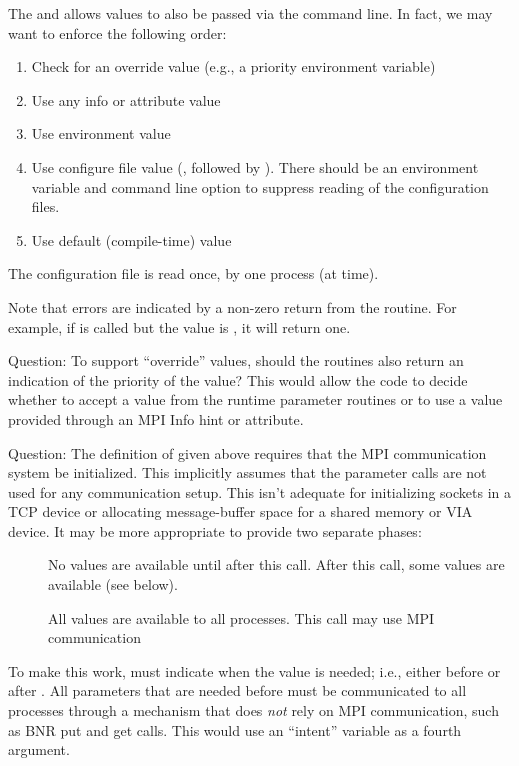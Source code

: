 \documentclass{article}
\begin{document}
The  and  allows
values to also be passed via the command line.  
In fact, we may want to enforce the following order:
\begin{enumerate}
\item Check for an override value (e.g., a priority environment variable)
\item Use any info or attribute value
\item Use environment value
\item Use configure file value (, followed by
  ).  There should be an environment variable and command
  line option to suppress reading of the configuration files.
\item Use default (compile-time) value
\end{enumerate}
The configuration file is read once, by one process (at
 time).  

Note that errors are indicated by a non-zero return from the routine.
For example, if  is called but the value
is , it will return one.

Question: To support ``override'' values, should the routines also
return an indication of the priority of the value?  This would allow
the code to decide whether to accept a value from the runtime
parameter routines or to use a value provided through an MPI Info hint
or attribute.

Question: The definition of  given above
requires that the MPI communication system be initialized.  This
implicitly assumes that the parameter calls are not used for any
communication setup.  This isn't adequate for initializing sockets in
a TCP device or allocating message-buffer space for a shared memory or
VIA device.  It may be more appropriate to provide two separate
phases:
\begin{description}
\item[]No values are available until after this call.  
After this call, some values are available (see below).
\item[]All values are available to all processes.  This 
call may use MPI communication
\end{description}
To make this work,  must indicate when the
value is needed; i.e., either before or after
.  All parameters that are needed before
 must be communicated to all processes through
a mechanism that does \emph{not} rely on MPI communication, such as
BNR put and get calls.  This would use an ``intent'' variable as a
fourth argument.
\end{document}
